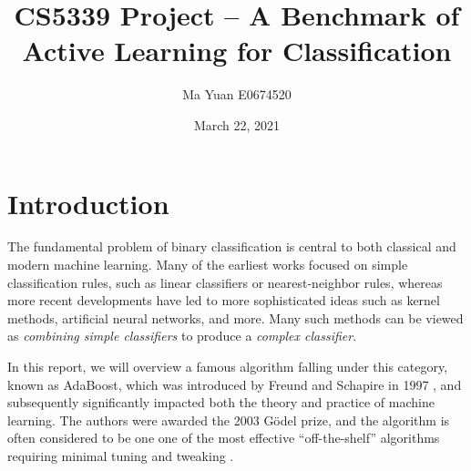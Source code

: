 \documentclass[english,12pt]{article}
\title{CS5339 Project -- A Benchmark of Active Learning for Classification}
\date{March 22, 2021}
\author{Ma Yuan E0674520}
\begin{document}
	\maketitle
	
	\section{Introduction} \label{sec:intro}
	
	The fundamental problem of binary classification is central to both classical and modern machine learning.  Many of the earliest works focused on simple classification rules, such as linear classifiers or nearest-neighbor rules, whereas more recent developments have led to more sophisticated ideas such as kernel methods, artificial neural networks, and more.  Many such methods can be viewed as {\em combining simple classifiers} to produce a {\em complex classifier}.
	
	In this report, we will overview a famous algorithm falling under this category, known as AdaBoost, which was introduced by Freund and Schapire in 1997 \cite{freund1997decision}, and subsequently significantly impacted both the theory and practice of machine learning.  The authors were awarded the 2003 G\"odel prize, and the algorithm is often considered to be one one of the most effective ``off-the-shelf'' algorithms requiring minimal tuning and tweaking \cite{blog,wiki}.
	
\end{document}

